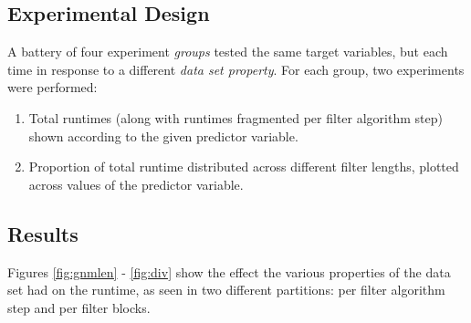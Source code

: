 \subsection{Experimental Design}
A battery of four experiment \textit{groups} tested the same target variables, but each time in response to a different \textit{data set property}. For each group, two experiments were performed:

\begin{enumerate}
\item Total runtimes (along with runtimes fragmented per \gls{filter algorithm} step) shown according to the given predictor variable.

\item Proportion of total runtime distributed across different \gls{filter} lengths, plotted across values of the predictor variable.
\end{enumerate}

\subsection{Results}
Figures \ref{fig:gnmlen} - \ref{fig:div} show the effect the various properties of the data set had on the runtime, as seen in two different partitions: per \gls{filter algorithm} step and per \gls{filter} blocks.



